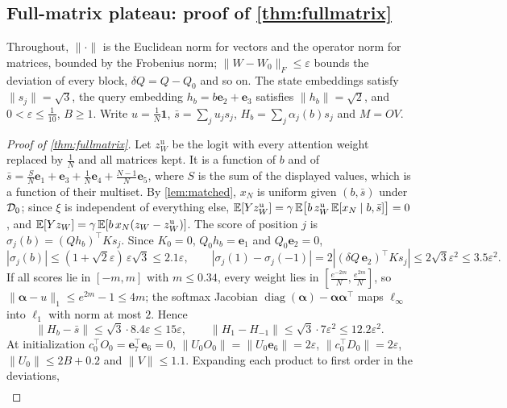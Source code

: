 \subsection{Full-matrix plateau: proof of \texorpdfstring{\cref{thm:fullmatrix}}{the full-matrix theorem}}
\label{app:fullmatrix}
Throughout, $\|\cdot\|$ is the Euclidean norm for vectors and the operator norm for matrices, bounded by the Frobenius norm;
$\|W-W_0\|_F\le\varepsilon$ bounds the deviation of every block, $\delta Q=Q-Q_0$ and so on. The state embeddings satisfy $\|s_j\|=\sqrt3$,
the query embedding $h_b=b\bm e_2+\bm e_3$ satisfies $\|h_b\|=\sqrt2$, and $0<\varepsilon\le\tfrac{1}{10}$, $B\ge1$.
Write $u=\tfrac{1}{N}\bm1$, $\bar s=\sum_j u_js_j$, $H_b=\sum_j\alpha_j(b)s_j$ and $M=OV$.

\begin{proof}[Proof of \cref{thm:fullmatrix}]
Let $z^{\mathrm{u}}_W$ be the logit with every attention weight replaced by $\tfrac1N$ and all matrices kept.
It is a function of $b$ and of $\bar s=\tfrac{S}{N}\bm e_1+\bm e_3+\tfrac1N\bm e_4+\tfrac{N-1}{N}\bm e_5$, where $S$ is the sum of the displayed values,
which is a function of their multiset. By \cref{lem:matched}, $x_N$ is uniform given $(b,\bar s)$ under $\mathcal D_{0}$; since $\xi$ is independent of everything else,
$\mathbb E[Yz^{\mathrm u}_W]=\gamma\,\mathbb E\bigl[b\,z^{\mathrm u}_W\,\mathbb E[x_N\mid b,\bar s]\bigr]=0$, and $\mathbb E[Yz_W]=\gamma\,\mathbb E[b\,x_N(z_W-z^{\mathrm u}_W)]$.
The score of position $j$ is $\sigma_j(b)=(Qh_b)^\top Ks_j$. Since $K_0=0$, $Q_0h_b=\bm e_1$ and $Q_0\bm e_2=0$,
\[
 |\sigma_j(b)|\le(1+\sqrt2\varepsilon)\,\varepsilon\sqrt3\le2.1\varepsilon,\qquad
 |\sigma_j(1)-\sigma_j(-1)|=2|(\delta Q\,\bm e_2)^\top Ks_j|\le2\sqrt3\varepsilon^2\le3.5\varepsilon^2 .
\]
If all scores lie in $[-m,m]$ with $m\le0.34$, every weight lies in $[\tfrac{e^{-2m}}{N},\tfrac{e^{2m}}{N}]$, so $\|\bm\alpha-u\|_1\le e^{2m}-1\le4m$;
the softmax Jacobian $\operatorname{diag}(\bm\alpha)-\bm\alpha\bm\alpha^\top$ maps $\ell_\infty$ into $\ell_1$ with norm at most $2$. Hence
\[
 \|H_b-\bar s\|\le\sqrt3\cdot8.4\varepsilon\le15\varepsilon,\qquad
 \|H_1-H_{-1}\|\le\sqrt3\cdot7\varepsilon^2\le12.2\varepsilon^2 .
\]
At initialization $c_0^\top O_0=\bm e_7^\top\bm e_6=0$, $\|U_0O_0\|=\|U_0\bm e_6\|=2\varepsilon$, $\|c_0^\top D_0\|=2\varepsilon$, $\|U_0\|\le2B+0.2$ and $\|V\|\le1.1$.
Expanding each product to first order in the deviations,
\begin{align*}

\end{align*}
\end{proof}
